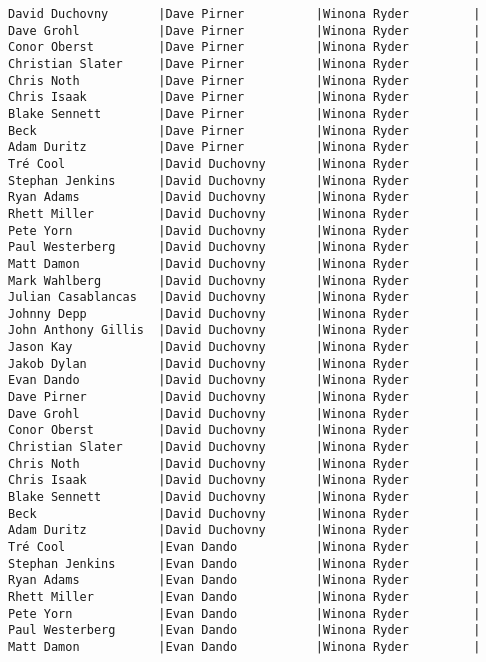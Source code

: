 \documentclass{article}
\begin{document}
\begin{verbatim}
David Duchovny       |Dave Pirner          |Winona Ryder         |
Dave Grohl           |Dave Pirner          |Winona Ryder         |
Conor Oberst         |Dave Pirner          |Winona Ryder         |
Christian Slater     |Dave Pirner          |Winona Ryder         |
Chris Noth           |Dave Pirner          |Winona Ryder         |
Chris Isaak          |Dave Pirner          |Winona Ryder         |
Blake Sennett        |Dave Pirner          |Winona Ryder         |
Beck                 |Dave Pirner          |Winona Ryder         |
Adam Duritz          |Dave Pirner          |Winona Ryder         |
Tré Cool             |David Duchovny       |Winona Ryder         |
Stephan Jenkins      |David Duchovny       |Winona Ryder         |
Ryan Adams           |David Duchovny       |Winona Ryder         |
Rhett Miller         |David Duchovny       |Winona Ryder         |
Pete Yorn            |David Duchovny       |Winona Ryder         |
Paul Westerberg      |David Duchovny       |Winona Ryder         |
Matt Damon           |David Duchovny       |Winona Ryder         |
Mark Wahlberg        |David Duchovny       |Winona Ryder         |
Julian Casablancas   |David Duchovny       |Winona Ryder         |
Johnny Depp          |David Duchovny       |Winona Ryder         |
John Anthony Gillis  |David Duchovny       |Winona Ryder         |
Jason Kay            |David Duchovny       |Winona Ryder         |
Jakob Dylan          |David Duchovny       |Winona Ryder         |
Evan Dando           |David Duchovny       |Winona Ryder         |
Dave Pirner          |David Duchovny       |Winona Ryder         |
Dave Grohl           |David Duchovny       |Winona Ryder         |
Conor Oberst         |David Duchovny       |Winona Ryder         |
Christian Slater     |David Duchovny       |Winona Ryder         |
Chris Noth           |David Duchovny       |Winona Ryder         |
Chris Isaak          |David Duchovny       |Winona Ryder         |
Blake Sennett        |David Duchovny       |Winona Ryder         |
Beck                 |David Duchovny       |Winona Ryder         |
Adam Duritz          |David Duchovny       |Winona Ryder         |
Tré Cool             |Evan Dando           |Winona Ryder         |
Stephan Jenkins      |Evan Dando           |Winona Ryder         |
Ryan Adams           |Evan Dando           |Winona Ryder         |
Rhett Miller         |Evan Dando           |Winona Ryder         |
Pete Yorn            |Evan Dando           |Winona Ryder         |
Paul Westerberg      |Evan Dando           |Winona Ryder         |
Matt Damon           |Evan Dando           |Winona Ryder         |

\end{verbatim}
\end{document}

